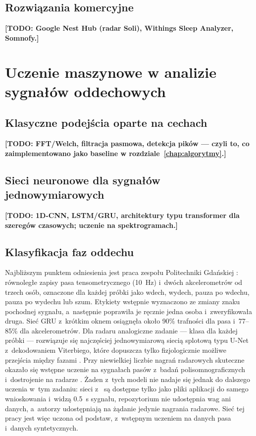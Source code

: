 \documentclass[12pt,a4paper,oneside]{report}
\newcommand{\todo}[1]{\textcolor{red!75!black}{\textbf{[TODO: #1]}}}
\newcommand{\miejsce}[1]{\todo{#1}}
\begin{document}
\section{Rozwiązania komercyjne}
\miejsce{Google Nest Hub (radar Soli), Withings Sleep Analyzer, Somnofy.}

\chapter{Uczenie maszynowe w analizie sygnałów oddechowych}
\label{chap:sota-ml}

\section{Klasyczne podejścia oparte na cechach}
\miejsce{FFT/Welch, filtracja pasmowa, detekcja pików --- czyli to, co
zaimplementowano jako baseline w rozdziale~\ref{chap:algorytmy}.}

\section{Sieci neuronowe dla sygnałów jednowymiarowych}
\miejsce{1D-CNN, LSTM/GRU, architektury typu transformer dla szeregów
czasowych; uczenie na spektrogramach.}

\section{Klasyfikacja faz oddechu}
Najbliższym punktem odniesienia jest praca zespołu Politechniki Gdańskiej
\cite{szymanski2025}: równoległe zapisy pasa tensometrycznego
(\SI{10}{Hz}) i~dwóch akcelerometrów od trzech osób, oznaczone dla każdej
próbki jako wdech, wydech, pauza po wdechu, pauza po wydechu lub szum.
Etykiety wstępnie wyznaczono ze zmiany znaku pochodnej sygnału, a~następnie
poprawiła je ręcznie jedna osoba i~zweryfikowała druga. Sieć GRU
z~krótkim oknem osiągnęła około 90\% trafności dla pasa i~77--85\% dla
akcelerometrów. Dla radaru analogiczne zadanie --- klasa dla każdej
próbki --- rozwiązuje się najczęściej jednowymiarową siecią splotową typu
U-Net \cite{perslev2019} z~dekodowaniem Viterbiego, które dopuszcza tylko
fizjologicznie możliwe przejścia między fazami \cite{holosis_repo}. Przy
niewielkiej liczbie nagrań radarowych skuteczne okazało się wstępne uczenie
na sygnałach pasów z~badań polisomnograficznych i~dostrojenie na radarze
\cite{lu2026}. Żaden z~tych modeli nie nadaje się jednak do dalszego uczenia
w~tym zadaniu: sieci z~\cite{szymanski2025} są dostępne tylko jako pliki
aplikacji do samego wnioskowania i~widzą \SI{0.5}{s} sygnału,
repozytorium \cite{holosis_repo} nie udostępnia wag ani danych, a~autorzy
\cite{lu2026} udostępniają na żądanie jedynie nagrania radarowe. Sieć tej
pracy jest więc uczona od podstaw, z~wstępnym uczeniem na danych pasa
i~danych syntetycznych.
\end{document}
